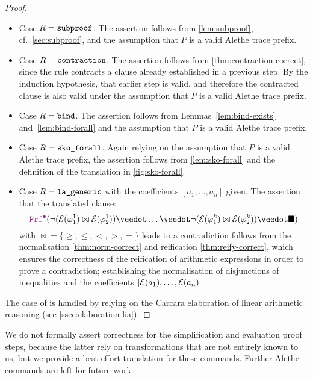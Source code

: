 \begin{proof}
\begin{itemize}
  \item Case $R = \texttt{\upshape{subproof}}$. The assertion follows from \cref{lem:subproof}, cf.\ \cref{sec:subproof}, and the assumption that $P$ is a valid Alethe trace prefix.
  \item Case $R = \texttt{\upshape{contraction}}$.
    The assertion follows from \cref{thm:contraction-correct}, since the rule contracts a clause already established in a previous step. 
    By the induction hypothesis, that earlier step is valid, and therefore the contracted clause is also valid under the assumption that $P$ is a valid Alethe trace prefix.
  \item Case $R = \texttt{\upshape{bind}}$. The assertion follows from Lemmas~\ref{lem:bind-exists} and~\ref{lem:bind-forall} and the assumption that $P$ is a valid Alethe trace prefix.
  \item Case $R = \texttt{\upshape{sko\_forall}}$. Again relying on the assumption that $P$ is a valid Alethe trace prefix, the assertion follows from \cref{lem:sko-forall} and the definition of the translation in \cref{fig:sko-forall}.
  \item Case $R = \texttt{\upshape{la\_generic}}$ with the coefficients $[a_1 ,\dots, a_n]$ given. The assertion that the translated clause:
    \[
        \prfcl (\neg(\E{\varphi^1_1} \bowtie \E{\varphi^1_2}) \veedot \dots \veedot  \neg(\E{\varphi^k_1} \bowtie \E{\varphi^k_2}) \veedot \nil)
    \]
    with $\bowtie = \{ \geq, \leq, <, >, = \}$ leads to a contradiction follows from the normalisation \cref{thm:norm-correct} and reification \cref{thm:reify-correct}, which ensures the correctness of the reification of arithmetic expressions in order to prove a contradiction;
    establishing the normalisation of disjunctions of inequalities and the coefficients $[\mathcal{E}(a_1) ,\dots, \mathcal{E}(a_n)]$. 
  \end{itemize}
    The case of  is handled by relying on the Carcara elaboration of linear arithmetic reasoning (see \cref{ssec:elaboration-lia}). 

\end{proof}

We do not formally assert correctness for the simplification and evaluation proof steps, because the latter rely on transformations that are not entirely known to us, but we provide a best-effort translation for these commands. Further Alethe commands are left for future work.
